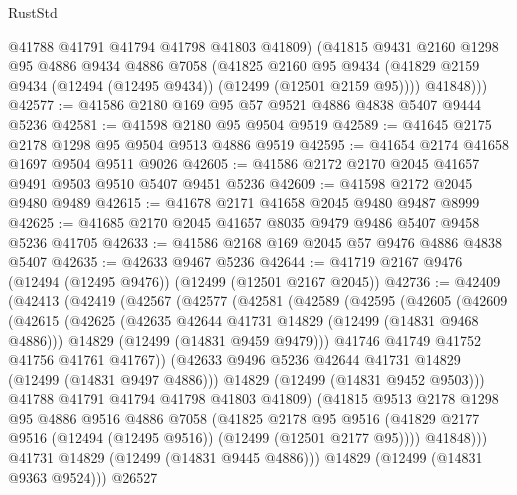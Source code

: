 \begin{lexlean}{RustStd}
\begin{coremodule}
{\begin{coremodule}
{{{{{{{{{{{{{{{{{{{{{{{{{{{{{{{{{{{{{{{{{{{{{{{{{{{{{{{{{{{{{{{{{{{{{{{{{{{{{{{{          @41788
          @41791
          @41794
          @41798
          @41803
          @41809)
        (@41815
          @9431
          @2160
          @1298
          @95
          @4886
          @9434
          @4886
          @7058
          (@41825
            @2160
            @95
            @9434
            (@41829 @2159 @9434 (@12494 (@12495 @9434)) (@12499 (@12501 @2159 @95))))
          @41848)))
@42577 := @41586 @2180 @169 @95 @57 @9521 @4886 @4838 @5407 @9444 @5236
@42581 := @41598 @2180 @95 @9504 @9519
@42589 := @41645 @2175 @2178 @1298 @95 @9504 @9513 @4886 @9519
@42595 := @41654 @2174 @41658 @1697 @9504 @9511 @9026
@42605 := @41586 @2172 @2170 @2045 @41657 @9491 @9503 @9510 @5407 @9451 @5236
@42609 := @41598 @2172 @2045 @9480 @9489
@42615 := @41678 @2171 @41658 @2045 @9480 @9487 @8999
@42625 := @41685 @2170 @2045 @41657 @8035 @9479 @9486 @5407 @9458 @5236 @41705
@42633 := @41586 @2168 @169 @2045 @57 @9476 @4886 @4838 @5407
@42635 := @42633 @9467 @5236
@42644 := @41719 @2167 @9476 (@12494 (@12495 @9476)) (@12499 (@12501 @2167 @2045))
@42736 := @42409
    (@42413
      (@42419
        (@42567
          (@42577
            (@42581
              (@42589
                (@42595
                  (@42605
                    (@42609
                      (@42615
                        (@42625
                          (@42635 @42644 @41731 @14829 (@12499 (@14831 @9468 @4886)))
                          @14829
                          (@12499 (@14831 @9459 @9479)))
                        @41746
                        @41749
                        @41752
                        @41756
                        @41761
                        @41767))
                    (@42633 @9496 @5236 @42644 @41731 @14829 (@12499 (@14831 @9497 @4886)))
                    @14829
                    (@12499 (@14831 @9452 @9503)))
                  @41788
                  @41791
                  @41794
                  @41798
                  @41803
                  @41809)
                (@41815
                  @9513
                  @2178
                  @1298
                  @95
                  @4886
                  @9516
                  @4886
                  @7058
                  (@41825
                    @2178
                    @95
                    @9516
                    (@41829 @2177 @9516 (@12494 (@12495 @9516)) (@12499 (@12501 @2177 @95))))
                  @41848)))
            @41731
            @14829
            (@12499 (@14831 @9445 @4886)))
          @14829
          (@12499 (@14831 @9363 @9524)))
        @26527
}}}}}}}}}}}}}}}}}}}}}}}}}}}}}}}}}}}}}}}}}}}}}}}}}}}}}}}}}}}}}}}}}}}}}}}}}}}}}}}}
\end{coremodule}}
\end{coremodule}
\end{lexlean}
